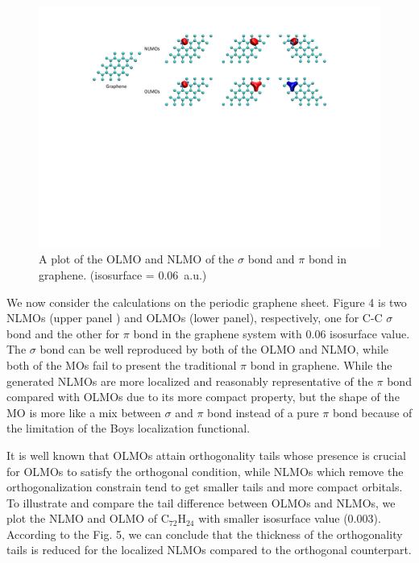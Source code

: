\documentclass[aps,prl,reprint,amsmath,amssymb]{revtex4-1}
\begin{document}
\begin{figure}[hbpt]
\centering
\includegraphics[width=\textwidth]{figure_4.pdf}
\caption{A plot of the OLMO and NLMO of the $\sigma$ bond and $\pi$ bond in graphene. (isosurface = 0.06~a.u.)}
\end{figure}

We now consider the calculations on the periodic graphene sheet.
Figure 4 is two NLMOs (upper panel ) and OLMOs (lower panel), respectively, one for C-C $\sigma$ bond and the other for $\pi$ bond in the graphene system with 0.06 isosurface value.
The $\sigma$ bond can be well reproduced by both of the OLMO and NLMO, while both of the MOs fail to present the traditional $\pi$ bond in graphene.
While the generated NLMOs are more localized and reasonably representative of the $\pi$ bond compared with OLMOs due to its more compact property, but the shape of the MO is more like a mix between $\sigma$ and $\pi$ bond instead of a pure $\pi$ bond because of the limitation of the Boys localization functional.

It is well known that OLMOs attain orthogonality tails whose presence is crucial for OLMOs to satisfy the orthogonal condition, while NLMOs which remove the orthogonalization constrain tend to get smaller tails and more compact orbitals. 
To illustrate and compare the tail difference between OLMOs and NLMOs, we plot the NLMO and OLMO of C$_{72}$H$_{24}$ with smaller isosurface value (0.003).
According to the Fig. 5, we can conclude that the thickness of the orthogonality tails is reduced for the localized NLMOs compared to the orthogonal counterpart.
\end{document}
